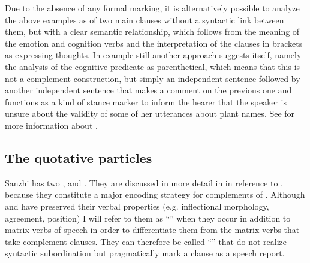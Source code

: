 Due to the absence of any formal marking, it is alternatively possible to analyze the above examples as  of two main clauses without a syntactic link between them, but with a clear semantic relationship, which follows from the meaning of the emotion and cognition verbs and the interpretation of the clauses in brackets as expressing thoughts. In example  still another approach suggests itself, namely the analysis of the cognitive predicate as parenthetical, which means that this is not a complement construction, but simply an independent sentence followed by another independent sentence that makes a comment on the previous one and functions as a kind of stance marker to inform the hearer that the speaker is unsure about the validity of some of her utterances about plant names. See  for more information about .




\subsection{The quotative particles}
\label{ssec:The quotative particles}

Sanzhi has two  ,  and . They are discussed in more detail in  in reference to , because they constitute a major encoding strategy for complements of . Although  and  have preserved their verbal properties (e.g. inflectional morphology,  agreement, position) I will refer to them as ``'' when they occur in addition to matrix verbs of speech in order to differentiate them from the matrix verbs that take complement clauses. They can therefore be called ``'' that do not realize syntactic subordination but pragmatically mark a clause as a speech report.

